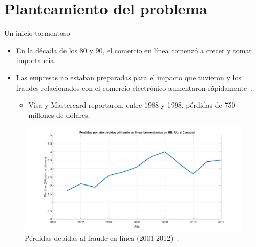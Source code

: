%
%
%


\section{Planteamiento del problema}


\begin{frame}{Un inicio tormentoso}
  {
    \begin{itemize}
      \item En la década de los 80 y 90, el comercio en línea comenzó a crecer y
        tomar importancia.
      \item Las empresas no estaban preparadas para el impacto que tuvieron y
        los fraudes relacionados con el comercio electrónico aumentaron
        rápidamente~\cite{search_security}.
        \begin{itemize}
          \item Visa y Mastercard reportaron, entre 1988 y 1998, pérdidas de 750
            millones de dólares.
        \end{itemize}
    \end{itemize}
  }

  {
    \begin{figure}[H]
      \begin{center}
        \includegraphics[width=1.0\linewidth]
          {../../diagramas_comunes/intro/perdidas_fraude}
        \caption{Pérdidas debidas al fraude en línea
          (2001-2012)~\cite{wallethub}.}
      \end{center}
    \end{figure}
  }
\end{frame}

